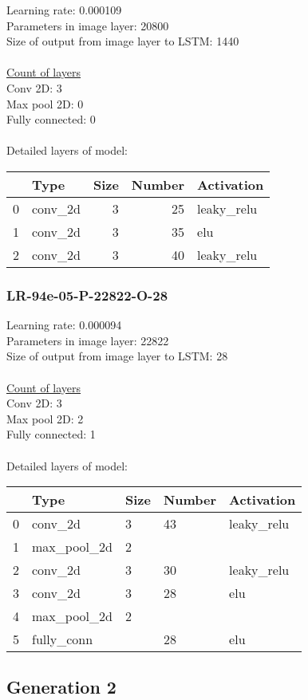 Learning rate: 0.000109
\\Parameters in image layer: 20800
\\Size of output from image layer to LSTM: 1440
\\\\\underline{Count of layers} 
\\Conv 2D:           3\\Max pool 2D:      0\\Fully connected:  0
\\\\Detailed layers of model: \\\begin{tabular}{rlrrl}
\hline
    & Type    &   Size &   Number & Activation   \\
\hline
  0 & conv\_2d &      3 &       25 & leaky\_relu   \\
  1 & conv\_2d &      3 &       35 & elu          \\
  2 & conv\_2d &      3 &       40 & leaky\_relu   \\
\hline
\end{tabular}\subsubsection*{LR-94e-05-P-22822-O-28}
Learning rate: 0.000094
\\Parameters in image layer: 22822
\\Size of output from image layer to LSTM: 28
\\\\\underline{Count of layers} 
\\Conv 2D:           3\\Max pool 2D:      2\\Fully connected:  1
\\\\Detailed layers of model: \\\begin{tabular}{rllll}
\hline
    & Type        & Size   & Number   & Activation   \\
\hline
  0 & conv\_2d     & 3      & 43       & leaky\_relu   \\
  1 & max\_pool\_2d & 2      &          &              \\
  2 & conv\_2d     & 3      & 30       & leaky\_relu   \\
  3 & conv\_2d     & 3      & 28       & elu          \\
  4 & max\_pool\_2d & 2      &          &              \\
  5 & fully\_conn  &        & 28       & elu          \\
\hline
\end{tabular}\subsection{Generation 2}
